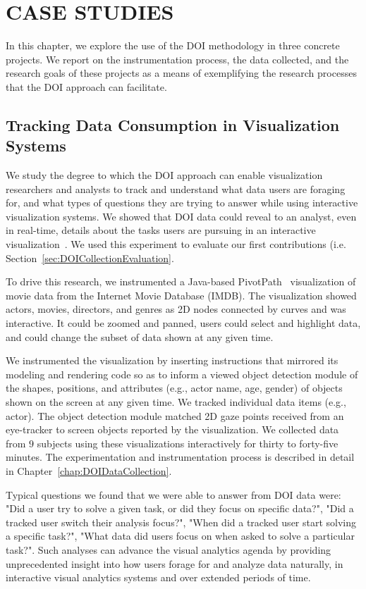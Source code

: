 \chapter{CASE STUDIES}
\label{chap:CaseStudies}

In this chapter, we explore the use of the DOI methodology in three concrete projects. We report on the instrumentation process, the data collected, and the research goals of these projects as a means of exemplifying the research processes that the DOI approach can facilitate.  

\section{Tracking Data Consumption in Visualization Systems}
\label{sec:ExperimentIMDB}
We study the degree to which the DOI approach can enable visualization researchers and analysts to track and understand what data users are foraging for, and what types of questions they are trying to answer while using interactive visualization systems. We showed that DOI data could reveal to an analyst, even in real-time, details about the tasks users are pursuing in an interactive visualization~\cite{Ala16, alam2015they}. We used this experiment to evaluate our first contributions (i.e. Section~\ref{sec:DOICollectionEvaluation}. 

To drive this research, we instrumented a Java-based PivotPath~\cite{Dor12} visualization of movie data from the Internet Movie Database (IMDB). The visualization showed actors, movies, directors, and genres as 2D nodes connected by curves and was interactive. It could be zoomed and panned, users could select and highlight data, and could change the subset of data shown at any given time. 

We instrumented the visualization by inserting instructions that mirrored its modeling and rendering code so as to inform a viewed object detection module of the shapes, positions, and attributes (e.g., actor name, age, gender) of objects shown on the screen at any given time. We tracked individual data items (e.g., actor). The object detection module matched 2D gaze points received from an eye-tracker to screen objects reported by the visualization. We collected data from $9$ subjects using these visualizations interactively for thirty to forty-five minutes. The experimentation and instrumentation process is described in detail in Chapter~\ref{chap:DOIDataCollection}.

Typical questions we found that we were able to answer from DOI data were: "Did a user try to solve a given task, or did they focus on specific data?", "Did a tracked user switch their analysis focus?", "When did a tracked user start solving a specific task?", "What data did users focus on when asked to solve a particular task?". Such analyses can advance the visual analytics agenda by providing unprecedented insight into how users forage for and analyze data naturally, in interactive visual analytics systems and over extended periods of time. 

